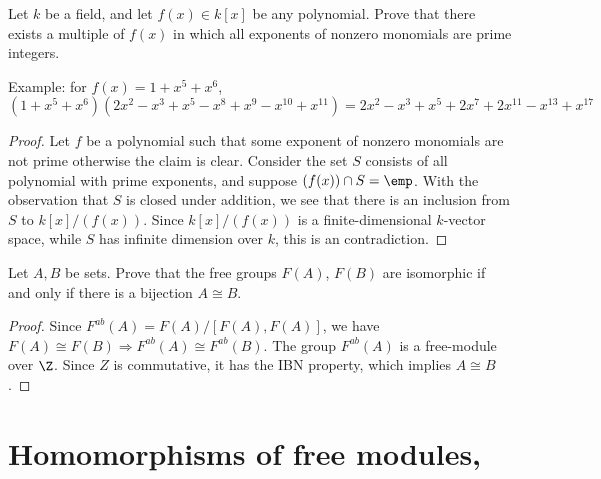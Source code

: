 \begin{exercise}
Let $k$ be a field, and let $f(x)\in k[x]$ be any polynomial. Prove that there exists a multiple of $f(x)$ in which all exponents of nonzero monomials are prime integers.\par
Example: for $f(x)=1+x^5+x^6$,
\[(1+x^5+x^6)(2x^2-x^3+x^5-x^8+x^9-x^{10}+x^{11})=2x^2-x^3+x^5+2x^7+2x^{11}-x^{13}+x^{17}\]
\end{exercise}
\begin{proof}
Let $f$ be a polynomial such that some exponent of nonzero monomials are not prime otherwise the claim is clear. Consider the set $S$ consists of all polynomial with prime exponents, and suppose $(f(x))\cap S=\emp$. With the observation that $S$ is closed under addition, we see that there is an inclusion from $S$ to $k[x]/(f(x))$. Since $k[x]/(f(x))$ is a finite-dimensional $k$-vector space, while $S$ has infinite dimension over $k$, this is an contradiction.
\end{proof}
\begin{exercise}
Let $A,B$ be sets. Prove that the free groups $F(A)$, $F(B)$ are isomorphic if and only if there is a bijection $A\cong B$.
\end{exercise}
\begin{proof}
Since $F^{ab}(A)=F(A)/[F(A),F(A)]$, we have $F(A)\cong F(B)\Rightarrow F^{ab}(A)\cong F^{ab}(B)$. The group $F^{ab}(A)$ is a free-module over $\Z$. Since $Z$ is commutative, it has the IBN property, which implies $A\cong B$.
\end{proof}
\section{Homomorphisms of free modules, }
